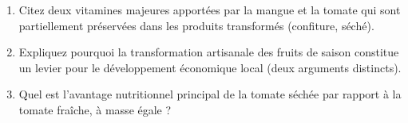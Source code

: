 \documentclass[11pt]{article}
\begin{document}
\begin{exercice}
\begin{enumerate}
    \item Citez deux vitamines majeures apportées par la mangue et la tomate qui sont partiellement préservées dans les produits transformés (confiture, séché).
    \item Expliquez pourquoi la transformation artisanale des fruits de saison constitue un levier pour le développement économique local (deux arguments distincts).
    \item Quel est l'avantage nutritionnel principal de la tomate séchée par rapport à la tomate fraîche, à masse égale ?
\end{enumerate}
\end{exercice}
\end{document}
